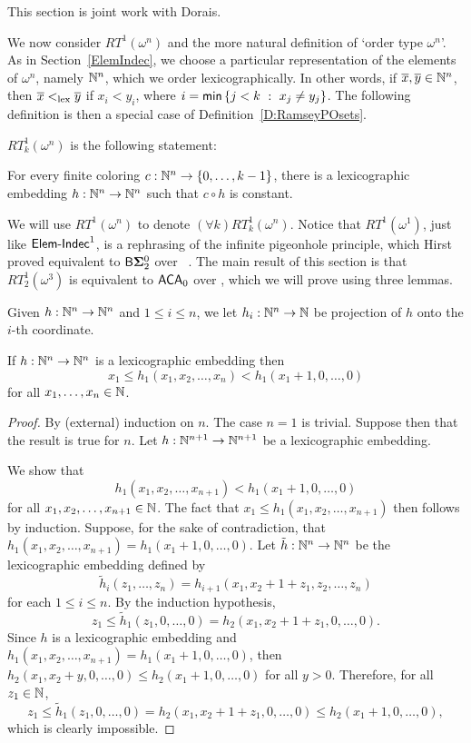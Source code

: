 This section is joint work with Dorais.

We now consider $RT^1(\omega^n)$ and the
more natural definition of `order type $\omega^n$'.
As in Section~\ref{ElemIndec}, we choose a particular
representation of the elements of $\omega^n$, namely $\mathbb{N}^n$,
which we order lexicographically.
In other words, if $\overline{x},\overline{y}\in\mathbb{N}^n$, then
$\overline{x}<_{\mathrm{lex}}\overline{y}$ if $x_i<y_i$, where $i=\mathsf{min}\left\{j<k\ :\ x_j\neq y_j\right\}$.
The following definition is then a special case of Definition~\ref{D:RamseyPOsets}.

\begin{definition}
$RT_k^1(\omega^n)$ is the following statement:

For every finite coloring $c: \mathbb{N}^n \to \{0,\dots,k-1\}$,
there is a lexicographic embedding
$h: \mathbb{N}^n \to \mathbb{N}^n$ such that $c \circ h$ is constant.
\end{definition}

We will use $RT^1(\omega^n)$ to denote $(\forall k)RT_k^1(\omega^n)$.
Notice that $RT^1(\omega^1)$, just like $\mathsf{Elem{\mbox{-}}Indec}^1$,
is a rephrasing of the infinite pigeonhole principle,
which Hirst proved equivalent to $\mathsf{B}{\mathbf{\Sigma}^0_2}$ over \RCAo\ \cite{Hirst:thesis}.
The main result of this section is that $RT^1_2(\omega^3)$ is equivalent to $\mathsf{ACA}_0$
over \RCAo, which we will prove using three lemmas.

Given $h:\mathbb{N}^n\to\mathbb{N}^n$ and $1\leq i\leq n$,
we let $h_i:\mathbb{N}^n\to\mathbb{N}$ be projection of $h$
onto the $i$-th coordinate.

\begin{lem}\label{L:lexfst}
If $h:\mathbb{N}^n\to\mathbb{N}^n$ is a lexicographic embedding then
$$x_1 \leq h_1(x_1,x_2,\dots,x_n) < h_1(x_1+1,0,\dots,0)$$
for all $x_1,\dots,x_n \in \mathbb{N}$.
\end{lem}

\begin{proof}
By (external) induction on $n$.
The case $n=1$ is trivial.
Suppose then that the result is true for $n$.
Let $h:\mathbb{N}^{n+1}\to\mathbb{N}^{n+1}$ be a lexicographic embedding.

We show that
$$h_1(x_1,x_2,\dots,x_{n+1}) < h_1(x_1+1,0,\dots,0)$$
for all $x_1,x_2,\dots,x_{n+1} \in \mathbb{N}$.
The fact that $x_1 \leq h_1(x_1,x_2,\dots,x_{n+1})$ then follows by induction.
Suppose, for the sake of contradiction, that
$h_1(x_1,x_2,\dots,x_{n+1})=h_1(x_1+1,0,\dots,0)$.
Let $\tilde{h}:\mathbb{N}^n\to\mathbb{N}^n$ be the lexicographic embedding defined by
$$\tilde{h}_i(z_1,\dots,z_n) = h_{i+1}(x_1,x_2+1+z_1,z_2,\dots,z_n)$$
for each $1\leq i\leq n$.
By the induction hypothesis,
$$z_1 \leq \tilde{h}_1(z_1,0,\dots,0) = h_2(x_1,x_2+1+z_1,0,\dots,0).$$
Since $h$ is a lexicographic embedding and
$h_1(x_1,x_2,\dots,x_{n+1})=h_1(x_1+1,0,\dots,0)$,
then $h_2(x_1,x_2+y,0,\ldots,0)\leq h_2(x_1+1,0,\dots,0)$ for all $y>0$.
Therefore, for all $z_1 \in \mathbb{N}$,
$$z_1 \leq \tilde{h}_1(z_1,0,\dots,0) = h_2(x_1,x_2+1+z_1,0,\dots,0)\leq h_2(x_1+1,0,\dots,0),$$
which is clearly impossible.
\end{proof}

